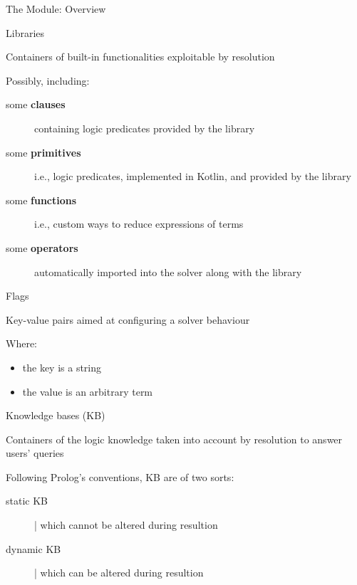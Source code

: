 \documentclass[handout]{beamer}
\begin{document}
\begin{frame}[allowframebreaks]{The  Module: Overview}
    \framebreak

    \begin{block}{Libraries}
        \begin{center}
            Containers of built-in functionalities exploitable by resolution
        \end{center}
        
        Possibly, including:
        \begin{description}
            \item[some \textbf{clauses}] containing logic predicates provided by the library
            \item[some \textbf{primitives}] i.e., logic predicates, implemented in Kotlin, and provided by the library
            \item[some \textbf{functions}] i.e., custom ways to reduce expressions of terms
            \item[some \textbf{operators}] automatically imported into the solver along with the library 
        \end{description}
    \end{block}

    \framebreak

    \begin{block}{Flags}
        \begin{center}
            Key-value pairs aimed at configuring a solver behaviour
        \end{center}
        
        Where:
        \begin{itemize}
            \item the key is a string
            \item the value is an arbitrary term
        \end{itemize}
    \end{block}

    \framebreak

    \begin{block}{Knowledge bases (KB)}
        \begin{center}
            Containers of the logic knowledge taken into account by resolution to answer users' queries
        \end{center}
        
        Following Prolog's conventions, KB are of two sorts:
        \begin{description}
            \item[static KB] | which cannot be altered during resultion
            \item[dynamic KB] | which can be altered during resultion 
        \end{description}
    \end{block}


\end{frame}
\end{document}
